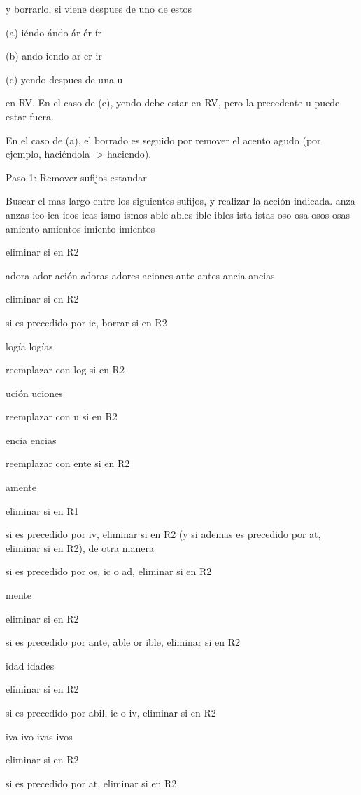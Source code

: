 y borrarlo, si viene despues de uno de estos

(a) i\'endo   \'ando   \'ar   \'er   \'ir

(b) ando   iendo   ar   er   ir

(c) yendo despues de una u

en RV. En el caso de (c), yendo debe estar en RV, pero la precedente u puede estar fuera. 

En el caso de (a), el borrado es seguido por remover el acento agudo (por ejemplo, haci\'endola -> haciendo).

Paso 1: Remover sufijos estandar

Buscar el mas largo entre los siguientes sufijos, y realizar la acci\'on indicada. 
anza   anzas   ico   ica   icos   icas   ismo   ismos   able   ables   ible   ibles   ista   istas   oso   osa   osos   osas   amiento   amientos   imiento   imientos

eliminar si en R2

adora   ador   aci\'on   adoras   adores   aciones   ante   antes   ancia   ancias

eliminar si en R2

si es precedido por ic, borrar si en R2 

log\'ia   log\'ias

reemplazar con log si en R2 

uci\'on   uciones

reemplazar con u si en R2 

encia   encias

reemplazar con ente si en R2 

amente

eliminar si en R1

si es precedido por iv, eliminar si en R2 (y si ademas es precedido por at, eliminar si en R2), de otra manera

si es precedido por os, ic o ad, eliminar si en R2 

mente

eliminar si en R2

si es precedido por ante, able or ible, eliminar si en R2 

idad   idades

eliminar si en R2

si es precedido por abil, ic o iv, eliminar si en R2 

iva   ivo   ivas   ivos

eliminar si en R2

si es precedido por at, eliminar si en R2

